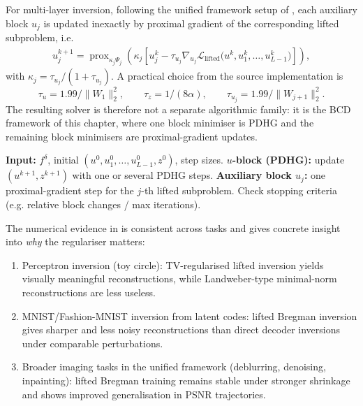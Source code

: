 For multi-layer inversion, following the unified framework setup of \cite{wang2025unified}, each auxiliary block $u_j$ is updated inexactly by proximal gradient of the corresponding lifted subproblem, i.e.
\begin{align*}
u_j^{k+1}=\operatorname{prox}_{\kappa_j\Psi_j}\!\left(\kappa_j\left[u_j^k-\tau_{u_j}\nabla_{u_j}\mathcal{L}_{\mathrm{lifted}}\big(u^k,u_1^k,\ldots,u_{L-1}^k\big)\right]\right),
\end{align*}
with $\kappa_j=\tau_{u_j}/(1+\tau_{u_j})$. A practical choice from the source implementation is
\begin{equation*}
\tau_u = 1.99/\|W_1\|_2^2, \qquad \tau_z = 1/(8\alpha), \qquad \tau_{u_j}=1.99/\|W_{j+1}\|_2^2.
\end{equation*}
The resulting solver is therefore not a separate algorithmic family: it is the BCD framework of this chapter, where one block minimiser is PDHG and the remaining block minimisers are proximal-gradient updates.

\begin{algorithm}
\caption{Lifted Inversion via BCD+PDHG}\label{alg:lifted_inversion_bcd_pdhg_ch9}
\begin{algorithmic}
\State \textbf{Input:} $f^\delta$, initial $(u^0,u_1^0,\ldots,u_{L-1}^0,z^0)$, step sizes.
\State \textbf{$u$-block (PDHG):} update $(u^{k+1},z^{k+1})$ with one or several PDHG steps.
\State \textbf{Auxiliary block $u_j$:} one proximal-gradient step for the $j$-th lifted subproblem.
\EndFor
\State Check stopping criteria (e.g. relative block changes / max iterations).
\EndFor
\end{algorithmic}
\end{algorithm}

The numerical evidence in \cite{wang2023inversion,wang2025unified} is consistent across tasks and gives concrete insight into \emph{why} the regulariser matters:
\begin{enumerate}
\item Perceptron inversion (toy circle): TV-regularised lifted inversion yields visually meaningful reconstructions, while Landweber-type minimal-norm reconstructions are less useless.
\item MNIST/Fashion-MNIST inversion from latent codes: lifted Bregman inversion gives sharper and less noisy reconstructions than direct decoder inversions under comparable perturbations.
\item Broader imaging tasks in the unified framework (deblurring, denoising, inpainting): lifted Bregman training remains stable under stronger shrinkage and shows improved generalisation in PSNR trajectories.
\end{enumerate}


